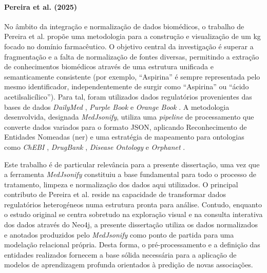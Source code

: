 \paragraph{Pereira et al. (2025)}
No âmbito da integração e normalização de dados biomédicos, o trabalho de Pereira et al. \cite{pereira2025mapping} propõe uma metodologia para a construção e visualização de um \acrshort{kg} focado no domínio farmacêutico. O objetivo central da investigação é superar a fragmentação e a falta de normalização de fontes diversas, permitindo a extração de conhecimentos biomédicos através de uma estrutura unificada e semanticamente consistente (por exemplo, \enquote{Aspirina} é sempre representada pelo mesmo identificador, independentemente de surgir como \enquote{Aspirina} ou \enquote{ácido acetilsalicílico}). Para tal, foram utilizados dados regulatórios provenientes das bases de dados \emph{DailyMed} \cite{dailymed}, \emph{Purple Book} \cite{purplebook} e \emph{Orange Book} \cite{orangebook}. A metodologia desenvolvida, designada \emph{MedJsonify}, utiliza uma \emph{pipeline} de processamento que converte dados variados para o formato JSON, aplicando Reconhecimento de Entidades Nomeadas (\acrshort{ner}) e uma estratégia de mapeamento para ontologias como \emph{ChEBI} \cite{hastings2016chebi}, \emph{DrugBank} \cite{Wishart2017}, \emph{Disease Ontology} \cite{schriml2022doid} e \emph{Orphanet} \cite{ordo2017}.

Este trabalho é de particular relevância para a presente dissertação, uma vez que a ferramenta \emph{MedJsonify} constituiu a base fundamental para todo o processo de tratamento, limpeza e normalização dos dados aqui utilizados. O principal contributo de Pereira et al. \cite{pereira2025mapping} reside na capacidade de transformar dados regulatórios heterogéneos numa estrutura pronta para análise. Contudo, enquanto o estudo original se centra sobretudo na exploração visual e na consulta interativa dos dados através do Neo4j, a presente dissertação utiliza os dados normalizados e anotados produzidos pelo \emph{MedJsonify} como ponto de partida para uma modelação relacional própria. Desta forma, o pré-processamento e a definição das entidades realizados fornecem a base sólida necessária para a aplicação de modelos de aprendizagem profunda orientados à predição de novas associações.


